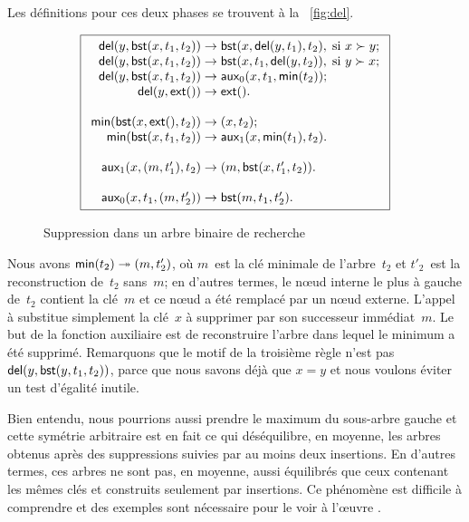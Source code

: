 Les définitions pour ces deux phases se trouvent à la
\fig~\vref{fig:del}.
\begin{figure}[!b]
\begin{equation*}
\boxed{
\begin{array}{r@{\;}l@{\;}l}
  \fun{del}(y,\fun{bst}(x,t_1,t_2)) & \rightarrow &
  \fun{bst}(x,\fun{del}(y,t_1),t_2),\; \text{si \(x \succ y\)};\\
\fun{del}(y,\fun{bst}(x,t_1,t_2)) & \rightarrow &
  \fun{bst}(x,t_1,\fun{del}(y,t_2)),\; \text{si \(y \succ x\)};\\
\fun{del}(y,\fun{bst}(x,t_1,t_2)) & \rightarrow &
   \fun{aux}_0(x,t_1,\fun{min}(t_2));\\
\fun{del}(y,\fun{ext}()) & \rightarrow & \fun{ext}().\\
\\
\fun{min}(\fun{bst}(x,\fun{ext}(),t_2)) & \rightarrow & \pair{x}{t_2};\\
\fun{min}(\fun{bst}(x,t_1,t_2)) & \rightarrow &
  \fun{aux}_1(x,\fun{min}(t_1),t_2).\\
\\
\fun{aux}_1(x,\pair{m}{t'_1},t_2) & \rightarrow &
  \pair{m}{\fun{bst}(x,t'_1,t_2)}.\\
\\
\fun{aux}_0(x,t_1,\pair{m}{t'_2}) & \rightarrow & \fun{bst}(m,t_1,t'_2).
\end{array}}
\end{equation*}
\caption{Suppression dans un arbre binaire de recherche}
\label{fig:del}
\end{figure}
Nous avons \(\textsf{min}(t_2) \twoheadrightarrow
({m},{t'_2})\), où \(m\)~est la clé minimale
de l'arbre~\(t_2\) et \(t'_2\)~est la reconstruction de~\(t_2\)
sans~\(m\); en d'autres termes, le n{\oe}ud interne le plus à gauche
de~\(t_2\) contient la clé~\(m\) et ce n{\oe}ud a été remplacé par un
n{\oe}ud externe. L'appel à  substitue simplement la
clé~\(x\) à supprimer par son successeur immédiat~\(m\). Le but de la
fonction auxiliaire  est de reconstruire l'arbre dans
lequel le minimum a été supprimé. Remarquons que le motif de la
troisième règle n'est pas \(\textsf{del}(y,
\textsf{bst}(y,t_1,t_2))\), parce que nous savons
déjà que \(x=y\) et nous voulons éviter un test d'égalité inutile.

Bien entendu, nous pourrions aussi prendre le maximum du sous-arbre
gauche et cette symétrie arbitraire est en fait ce qui déséquilibre,
en moyenne, les arbres obtenus après des suppressions suivies par au
moins deux insertions. En d'autres termes, ces arbres ne sont pas, en
moyenne, aussi équilibrés que ceux contenant les mêmes clés et
construits seulement par insertions. Ce phénomène est difficile à
comprendre et des exemples sont nécessaire pour le voir à l'{\oe}uvre
\citep{Eppinger_1983,CulbersonMunro_1989,CulbersonEvans_1994,Knuth_1998a,Heyer_2009}.


